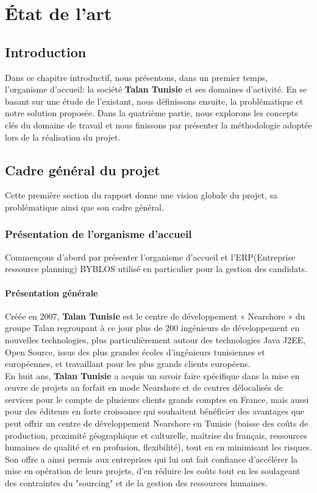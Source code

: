 \chapter{État de l'art}
\section*{Introduction}
\color{black}Dans ce chapitre introductif, nous présentons, dans un premier temps, l’organisme d’accueil: la société \textbf{Talan Tunisie} et ses domaines d'activité. En se basant sur une étude de l’existant, nous définissons ensuite, la problématique et notre solution proposée. Dans la quatrième partie, nous explorons les concepts clés du domaine de travail et nous finissons par présenter la méthodologie adoptée lors de la réalisation du projet.
\section{Cadre général du projet}
Cette première section du rapport donne une vision globale du projet, sa problématique ainsi que son cadre général.
\subsection{Présentation de l'organisme d'accueil}
Commençons d'abord par présenter l'organisme d'accueil et l'ERP(Entreprise ressource planning) BYBLOS utilisé en particulier pour la gestion des candidats.
\subsubsection{Présentation générale}
 Créée en 2007, \textbf{Talan Tunisie} est le centre de développement « Nearshore » du groupe Talan regroupant à ce jour plus de 200 ingénieurs de développement en nouvelles technologies, plus particulièrement autour des technologies Java J2EE, Open Source, issus des plus grandes écoles d’ingénieurs tunisiennes et européennes, et travaillant pour les plus grands clients européens.\\
En huit ans, \textbf{Talan Tunisie} a acquis un savoir faire spécifique dans la mise en œuvre de projets au forfait en mode Nearshore et de centres délocalisés de services  pour le compte de plusieurs clients grands comptes en France, mais aussi pour des éditeurs en forte croissance qui souhaitent bénéficier des avantages que peut offrir un centre de développement Nearshore en Tunisie (baisse des coûts de production, proximité géographique et culturelle,  maîtrise du français, ressources humaines de qualité et en profusion, flexibilité), tout en en minimisant les risques.\\
Son offre a ainsi permis aux entreprises qui lui ont fait confiance d’accélérer la mise en opération de leurs projets, d’en réduire les coûts tout en les soulageant des contraintes du "sourcing" et de la gestion des ressources humaines.

